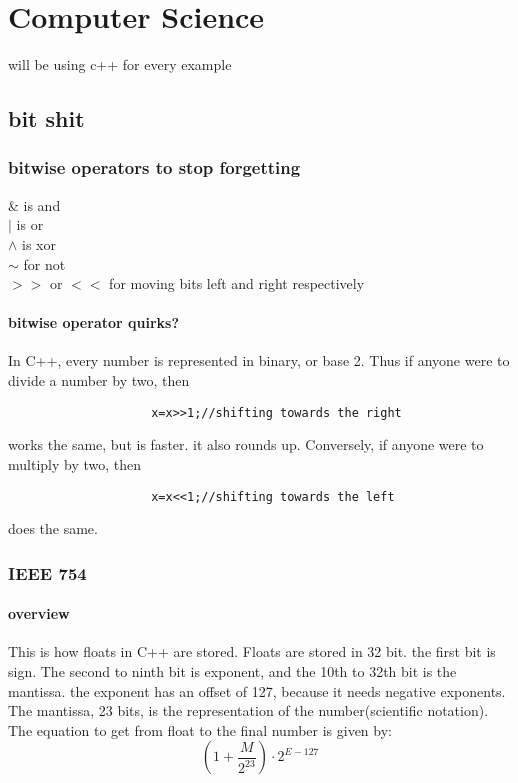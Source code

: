 \documentclass{article} %
\begin{document}
\section{Computer Science}\label{Computer Science}
will be using c++ for every example
    \subsection{bit shit}
        \subsubsection{bitwise operators to stop forgetting}
            \begin{center}
                \& is and\\$|$ is or\\$\wedge$ is xor\\$\sim$ for not\\$>>$ or $<<$ for moving bits left and right respectively
            \end{center}
            \paragraph{bitwise operator quirks?}
                In C++, every number is represented in binary, or base 2. Thus if anyone were to divide a number by two, then
                \begin{verbatim}
                    x=x>>1;//shifting towards the right
                \end{verbatim}
                works the same, but is faster. it also rounds up. Conversely, if anyone were to multiply by two, then 
                \begin{verbatim}
                    x=x<<1;//shifting towards the left
                \end{verbatim}
                does the same.
        \subsubsection{IEEE 754}
            \paragraph{overview}
                This is how floats in C++ are stored. Floats are stored in 32 bit. the first bit is sign.
                The second to ninth bit is exponent, and the 10th to 32th bit is the mantissa. the exponent has
                an offset of 127, because it needs negative exponents. The mantissa, 23 bits, is the representation of the number(scientific notation).
                The equation to get from float to the final number is given by:
                \begin{equation}
                    (1+\dfrac{M}{2^{23}})\cdot2^{E-127}
                \end{equation}
\end{document}

